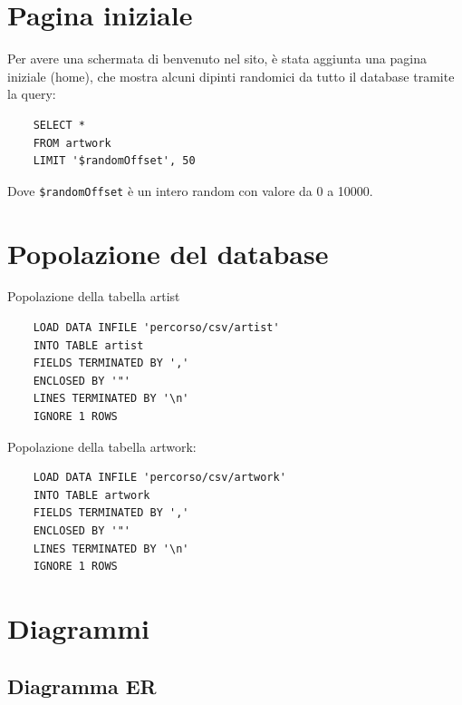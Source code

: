 \documentclass{ol-softwaremanual}
\begin{document}
\section{Pagina iniziale}
Per avere una schermata di benvenuto nel sito, è stata aggiunta una pagina iniziale (home), che mostra alcuni dipinti randomici da 
tutto il database tramite la query:
\begin{verbatim}
    SELECT *
    FROM artwork
    LIMIT '$randomOffset', 50
\end{verbatim}
Dove \verb|$randomOffset| è un intero random con valore da 0 a 10000.


\section{Popolazione del database}

Popolazione della tabella artist
\begin{verbatim}
    LOAD DATA INFILE 'percorso/csv/artist'
    INTO TABLE artist
    FIELDS TERMINATED BY ','
    ENCLOSED BY '"'
    LINES TERMINATED BY '\n'
    IGNORE 1 ROWS
\end{verbatim}


Popolazione della tabella artwork:
\begin{verbatim}
    LOAD DATA INFILE 'percorso/csv/artwork'
    INTO TABLE artwork
    FIELDS TERMINATED BY ','
    ENCLOSED BY '"'
    LINES TERMINATED BY '\n'
    IGNORE 1 ROWS
\end{verbatim}

\section{Diagrammi}
\subsection{Diagramma ER}

\newcommand {\key}[1]{\underline {#1}}
\end{document}
